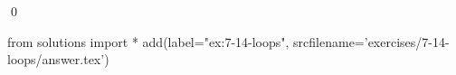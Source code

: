 
\begin{ex}
  \label{ex:7-14-loops}
  
  \qed
\end{ex}
\begin{python0}
from solutions import *
add(label="ex:7-14-loops",
    srcfilename='exercises/7-14-loops/answer.tex')
\end{python0}
